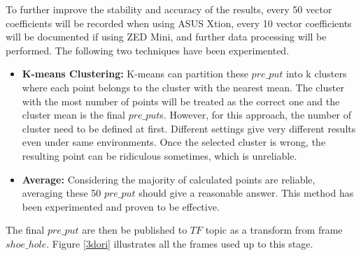 To further improve the stability and accuracy of the results, every 50 vector coefficients will be recorded when using ASUS Xtion, every 10 vector coefficients will be documented if using ZED Mini, and further data processing will be performed. The following two techniques have been experimented.

\begin{itemize}
    \item \textbf{K-means Clustering:} K-means can partition these $pre\_put$ into k clusters where each point belongs to the cluster with the nearest mean. The cluster with the most number of points will be treated as the correct one and the cluster mean is the final $pre\_put$s. However, for this approach, the number of cluster need to be defined at first. Different settings give very different results even under same environments. Once the selected cluster is wrong, the resulting point can be ridiculous sometimes, which is unreliable.
    
    \item \textbf{Average:} Considering the majority of calculated points are reliable, averaging these 50 $pre\_put$ should give a reasonable answer. This method has been experimented and proven to be effective.
\end{itemize}

The final $pre\_put$ are then be published to $TF$ topic as a transform from frame $shoe\_hole$. Figure \ref{3dori} illustrates all the frames used up to this stage.


